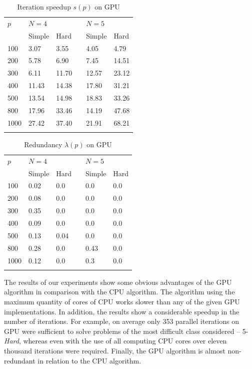\documentclass[smallcondensed]{svjour3}     %
\begin{document}
\begin{table}
	\caption{Iteration speedup $s(p)$ on GPU}
	\label{tab:last1}
	\center
	\begin{tabular}{llllll}
		\hline\noalign{\smallskip}
		$p$ & \multicolumn{2}{l}{ $N=4$ } & & \multicolumn{2}{l}{$N=5$} \\
		\noalign{\smallskip} \cline{2-3} \cline{5-6} \noalign{\smallskip}
		 & Simple & Hard & & Simple & Hard  \\
		\noalign{\smallskip} \hline \noalign{\smallskip}
		100	&	3.07	&	3.55	& &	4.05	&	4.79	\\
		200	&	5.78	&	6.90	& &	7.45	&	14.51	\\
		300	&	6.11	&	11.70	& &	12.57	&	23.12	\\
		400	&	11.43	&	14.38	& &	17.80	&	31.21	\\
		500	&	13.54	&	14.98	& &	18.83	&	33.26	\\
		800	&	17.96	&	33.46	& &	14.19	&	47.68	\\
		1000	&	27.42	&	37.40	& &	21.91	&	68.21	\\
		\noalign{\smallskip}\hline
	\end{tabular}
\end{table}


\begin{table}
	\caption{Redundancy $\lambda(p)$ on GPU}
	\label{tab:last}
	\center
	\begin{tabular}{llllll}
		\hline\noalign{\smallskip}
		$p$ & \multicolumn{2}{l}{ $N=4$ } & & \multicolumn{2}{l}{$N=5$} \\
		\noalign{\smallskip} \cline{2-3} \cline{5-6} \noalign{\smallskip}
		 & Simple & Hard & & Simple & Hard  \\
		\noalign{\smallskip} \hline \noalign{\smallskip}
		100 & 0.02 & 0.0 & & 0.0 & 0.0  \\
		200 & 0.08 & 0.0 & & 0.0 & 0.0  \\
		300 & 0.35 & 0.0 & & 0.0 & 0.0  \\
		400 & 0.09 & 0.0 & & 0.0 & 0.0  \\
		500 & 0.13 & 0.04 & & 0.0 & 0.0  \\
		800 & 0.28 & 0.0 & & 0.43 & 0.0  \\
		1000 & 0.12 & 0.0 & & 0.3 & 0.0  \\
		\noalign{\smallskip}\hline
	\end{tabular}
\end{table}

The results of our experiments show some obvious advantages of the GPU algorithm in comparison with the CPU algorithm. The algorithm using the maximum quantity of cores of CPU works slower than any of the given GPU implementations. In addition, the results show a considerable speedup in the number of iterations. For example, on average only 353 parallel iterations on GPU were sufficient to solve problems of the most difficult class considered -- 5-\textit{Hard}, whereas even with the use of all computing CPU cores over eleven thousand iterations were required. Finally, the GPU algorithm is almost non-redundant in relation to the CPU algorithm.
\end{document}

